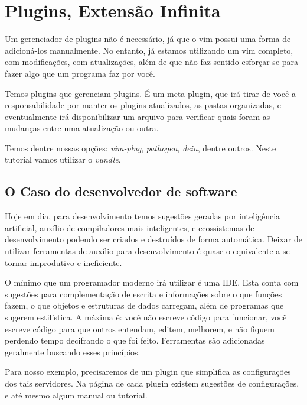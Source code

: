 \chapter{Plugins, Extensão Infinita}
Um gerenciador de plugins não é necessário, já que o vim possui uma forma de adicioná-los manualmente.
No entanto, já estamos utilizando um vim completo, com modificações, com atualizações,
além de que não faz sentido esforçar-se para fazer algo que um programa faz por você.


Temos plugins que gerenciam plugins.
É um meta-plugin, que irá tirar de você a responsabilidade por manter os plugins atualizados,
as pastas organizadas, e eventualmente irá disponibilizar um arquivo para verificar quais foram
as mudanças entre uma atualização ou outra.


Temos dentre nossas opções: \emph{vim-plug}, \emph{pathogen}, \emph{dein}, dentre outros.
Neste tutorial vamos utilizar o \emph{vundle}.


\section{O Caso do desenvolvedor de software}
Hoje em dia, para desenvolvimento temos sugestões geradas por inteligência artificial,
auxílio de compiladores mais inteligentes,
e ecossistemas de desenvolvimento podendo ser criados e destruídos de forma automática.
Deixar de utilizar ferramentas de auxílio para desenvolvimento é quase o equivalente a se tornar
improdutivo e ineficiente.

O mínimo que um programador moderno irá utilizar é uma IDE.
Esta conta com sugestões para complementação de escrita e informações sobre o
que funções fazem, o que objetos e estruturas de dados carregam, além de
programas que sugerem estilística.
A máxima é: você não escreve código para funcionar, você escreve código para que outros entendam,
editem, melhorem, e não fiquem perdendo tempo decifrando o que foi feito.
Ferramentas são adicionadas geralmente buscando esses princípios.

Para nosso exemplo, precisaremos de um plugin que simplifica as configurações dos tais servidores.
Na página de cada plugin existem sugestões de configurações, e até mesmo
algum manual ou tutorial. 

